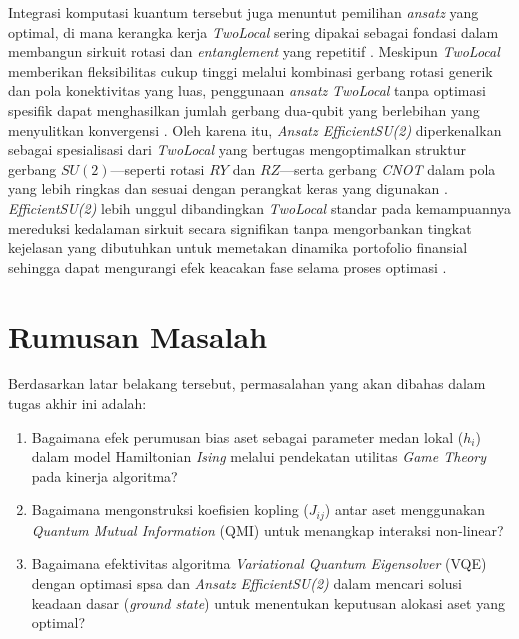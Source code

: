 Integrasi komputasi kuantum tersebut juga menuntut pemilihan \textit{ansatz} yang optimal, di mana kerangka kerja \textit{TwoLocal} sering dipakai sebagai fondasi dalam membangun sirkuit rotasi dan \textit{entanglement} yang repetitif \cite{dao_exploring_2025}. Meskipun \textit{TwoLocal} memberikan fleksibilitas cukup tinggi melalui kombinasi gerbang rotasi generik dan pola konektivitas yang luas, penggunaan \textit{ansatz} \textit{TwoLocal} tanpa optimasi spesifik dapat menghasilkan jumlah gerbang dua-qubit yang berlebihan yang menyulitkan konvergensi \cite{wang_achieving_2025}. Oleh karena itu, \textit{Ansatz EfficientSU(2)} diperkenalkan sebagai spesialisasi dari \textit{TwoLocal} yang bertugas mengoptimalkan struktur gerbang $SU(2)$—seperti rotasi $RY$ dan $RZ$—serta gerbang \textit{CNOT} dalam pola yang lebih ringkas dan sesuai dengan perangkat keras yang digunakan \cite{dao_exploring_2025}. \textit{EfficientSU(2)} lebih unggul dibandingkan \textit{TwoLocal} standar pada kemampuannya mereduksi kedalaman sirkuit secara signifikan tanpa mengorbankan tingkat kejelasan yang dibutuhkan untuk memetakan dinamika portofolio finansial sehingga dapat mengurangi efek keacakan fase selama proses optimasi \cite{dao_exploring_2025}.

\section{Rumusan Masalah}
Berdasarkan latar belakang tersebut, permasalahan yang akan dibahas dalam tugas akhir ini adalah:
\begin{enumerate}
    \item Bagaimana efek perumusan bias aset sebagai parameter medan lokal ($h_i$) dalam model Hamiltonian \textit{Ising} melalui pendekatan utilitas \textit{Game Theory} pada kinerja algoritma?
    \item Bagaimana mengonstruksi koefisien kopling ($J_{ij}$) antar aset menggunakan \textit{Quantum Mutual Information} (QMI) untuk menangkap interaksi non-linear?
    \item Bagaimana efektivitas algoritma \textit{Variational Quantum Eigensolver} (VQE) dengan optimasi spsa dan \textit{Ansatz EfficientSU(2)}  dalam mencari solusi keadaan dasar (\textit{ground state}) untuk menentukan keputusan alokasi aset yang optimal?
\end{enumerate}

